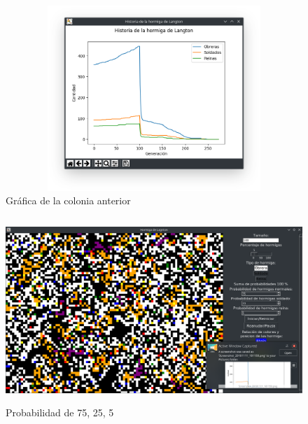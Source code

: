 \begin{figure}[H]
\begin{center}
 \includegraphics[width=12cm, height=7cm]{img/modificado2grafica.png}
 \caption{Gráfica de la colonia anterior}
 \label{fig:modificado2grafica}
\end{center}
\end{figure}

\begin{figure}[H]
\begin{center}
 \includegraphics[width=12cm, height=7cm]{img/modificado3.png}
 \caption{Probabilidad de 75, 25, 5}
 \label{fig:modificado3}
\end{center}
\end{figure}


